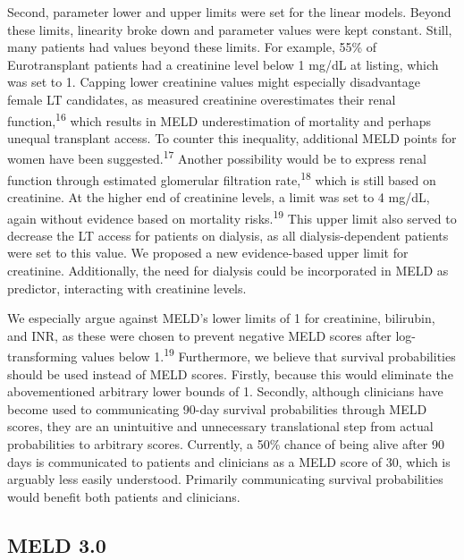 \documentclass[11pt,english,]{book} %
\begin{document}
Second, parameter lower and upper limits were set for the linear models. Beyond these limits, linearity broke down and parameter values were kept constant. Still, many patients had values beyond these limits. For example, 55\% of Eurotransplant patients had a creatinine level below 1 mg/dL at listing, which was set to 1. Capping lower creatinine values might especially disadvantage female LT candidates, as measured creatinine overestimates their renal function,\textsuperscript{16} which results in MELD underestimation of mortality and perhaps unequal transplant access. To counter this inequality, additional MELD points for women have been suggested.\textsuperscript{17} Another possibility would be to express renal function through estimated glomerular filtration rate,\textsuperscript{18} which is still based on creatinine. At the higher end of creatinine levels, a limit was set to 4 mg/dL, again without evidence based on mortality risks.\textsuperscript{19} This upper limit also served to decrease the LT access for patients on dialysis, as all dialysis-dependent patients were set to this value. We proposed a new evidence-based upper limit for creatinine. Additionally, the need for dialysis could be incorporated in MELD as predictor, interacting with creatinine levels.

We especially argue against MELD's lower limits of 1 for creatinine, bilirubin, and INR, as these were chosen to prevent negative MELD scores after log-transforming values below 1.\textsuperscript{19} Furthermore, we believe that survival probabilities should be used instead of MELD scores. Firstly, because this would eliminate the abovementioned arbitrary lower bounds of 1. Secondly, although clinicians have become used to communicating 90-day survival probabilities through MELD scores, they are an unintuitive and unnecessary translational step from actual probabilities to arbitrary scores. Currently, a 50\% chance of being alive after 90 days is communicated to patients and clinicians as a MELD score of 30, which is arguably less easily understood. Primarily communicating survival probabilities would benefit both patients and clinicians.

\hypertarget{meld-3.0}{%
\subsection*{MELD 3.0}\label{meld-3.0}}
\end{document}
